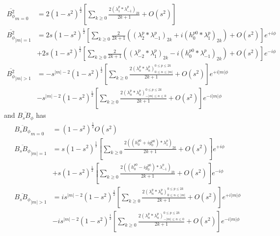 \begin{equation}
    \begin{aligned}
        \overline{B_\phi^2}_{m=0} &= 2\left(1 - s^2\right)^{\frac{1}{2}} \left[\sum_{k\geq 0} \frac{2 (\lambda_1^p * \lambda_{-1}^p)_{2k}}{2k+1} + O\left(s^2\right)\right] \\ 
        \overline{B_\phi^2}_{|m|=1} &= 2 s \left(1 - s^2\right)^{\frac{1}{2}} \left[\sum_{k\geq 0} \frac{2}{2k+1} \left((\lambda_2^p * \lambda_{-1}^p)_{2k} + i (h_0^{p0} * \lambda_{1}^p)_{2k}\right) + O\left(s^2\right)\right] e^{+i\phi} \\ 
        &+ 2 s \left(1 - s^2\right)^{\frac{1}{2}} \left[\sum_{k\geq 0} \frac{2}{2k+1} \left((\lambda_{-2}^p * \lambda_{1}^p)_{2k} - i(h_0^{p0} * \lambda_{-1}^p)_{2k}\right) + O\left(s^2\right)\right] e^{-i\phi} \\
        \overline{B_\phi^2}_{|m|>1} &= -s^{|m|-2} \left(1 - s^2\right)^{\frac{1}{2}} \left[\sum_{k\geq 0} \frac{2(\lambda_n^p * \lambda_{n}^p)_{0\leq n \leq |m|}^{0\leq p \leq 2k}}{2k+1} + O\left(s^2\right)\right] e^{+i|m|\phi} \\ 
        &- s^{|m|-2} \left(1 - s^2\right)^{\frac{1}{2}} \left[\sum_{k\geq 0} \frac{2(\lambda_n^p * \lambda_{n}^p)_{-|m|\leq n \leq 0}^{0\leq p \leq 2k}}{2k+1} + O\left(s^2\right)\right] e^{-i|m|\phi}
    \end{aligned}
\end{equation}
and $\overline{B_s B_\phi}$ has
\begin{equation}
\begin{aligned}
    \overline{B_s B_\phi}_{m=0} &= \left(1 - s^2\right)^{\frac{1}{2}} O\left(s^2\right) \\ 
    \overline{B_s B_\phi}_{|m|=1} &= s \left(1 - s^2\right)^{\frac{1}{2}} \left[\sum_{k\geq 0} \frac{2((h_0^{p0} + ig_0^{p0}) * \lambda_{1}^p)_{2k}}{2k+1} + O\left(s^2\right)\right] e^{+i\phi} \\ 
    &+ s \left(1 - s^2\right)^{\frac{1}{2}} \left[\sum_{k\geq 0} \frac{2((h_0^{p0} - ig_0^{p0}) * \lambda_{-1}^p)_{2k}}{2k+1} + O\left(s^2\right)\right] e^{-i\phi} \\
    \overline{B_s B_\phi}_{|m|>1} &= i s^{|m|-2} \left(1 - s^2\right)^{\frac{1}{2}} \left[\sum_{k\geq 0} \frac{2(\lambda_n^p * \lambda_{n}^p)_{0\leq n \leq |m|}^{0\leq p \leq 2k}}{2k+1} + O\left(s^2\right)\right] e^{+i|m|\phi} \\ 
    &- is^{|m|-2} \left(1 - s^2\right)^{\frac{1}{2}} \left[\sum_{k\geq 0} \frac{2(\lambda_n^p * \lambda_{n}^p)_{-|m|\leq n \leq 0}^{0\leq p \leq 2k}}{2k+1} + O\left(s^2\right)\right] e^{-i|m|\phi}
\end{aligned}
\end{equation}

